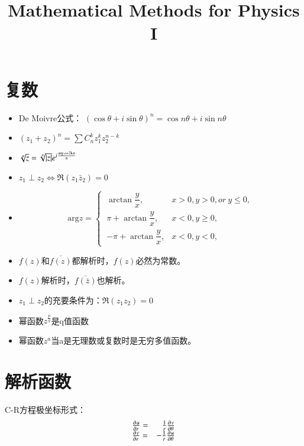 \documentclass[UTF8,9pt]{ctexart}
\title{Mathematical Methods for Physics I}
\begin{document}
    \maketitle

 
    \section{复数}
    
     
    \begin{itemize}
        \item De Moivre公式： 
            $(\cos\theta+i\sin\theta)^n=\cos n\theta+i \sin n\theta$
        \item $(z_1+z_2)^n=\sum C_n^k z_1^k z_2^{n-k}$ 
        \item $\sqrt[n]{z}=\sqrt[n]{|z|} e^{i\frac{\rm{arg}\,z+2k\pi}{n}}$
        \item $z_1 \perp z_2 \Leftrightarrow \Re(z_1\bar{z}_2)=0$
        \item $$\mathrm{arg}z=\left\{\  
            \begin{array}{lr}  
                \arctan\dfrac{y}{x},&x>0, y>0, or \ y \leq 0,\\
                \pi+\arctan\dfrac{y}{x},&x<0, y \geq 0,\\
                -\pi+\arctan\dfrac{y}{x},&x<0, y <0,
            \end{array}\right.$$
        \item $f(z)$和$\overline{f(z)}$都解析时，$f(z)$必然为常数。
        \item $f(z)$解析时，$\overline{f(\bar{z})}$也解析。
        \item $z_1 \perp z_2$的充要条件为：$\Re(z_1z_2)=0$
        \item 幂函数$z^{\frac{p}{q}}$是q值函数
        \item 幂函数$z^{a}$当a是无理数或复数时是无穷多值函数。
    \end{itemize}
\section{解析函数}
    C-R方程极坐标形式：
    $$\begin{array}{lr}
        \frac{\partial^{} u}{\partial r^{}}=&\frac{1}{r}\frac{\partial^{} v}{\partial \theta^{}}\\ 
        \frac{\partial^{} v}{\partial r^{}}=&-\frac{1}{r}\frac{\partial^{} u}{\partial \theta^{}}
    \end{array}$$
\end{document}
